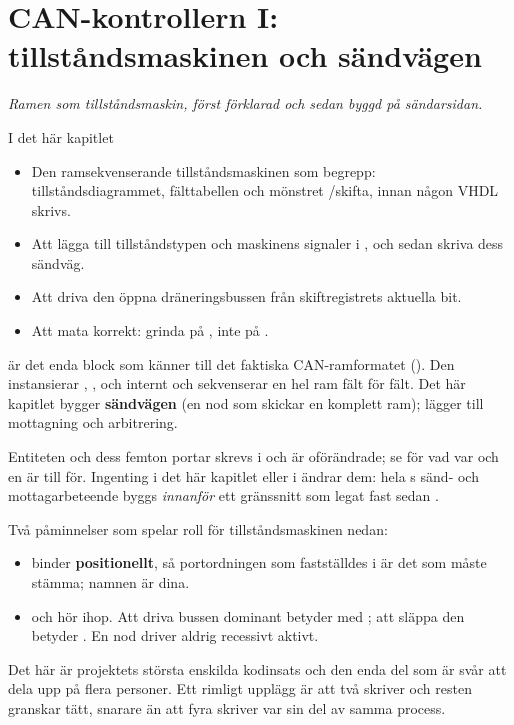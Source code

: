 
\chapter{CAN-kontrollern I: tillståndsmaskinen och sändvägen}
\label{c16:ch}

{\large\itshape Ramen som tillståndsmaskin, först förklarad och sedan byggd på sändarsidan.\par}

\begin{chapterbox}{I det här kapitlet}
\begin{itemize}
  \item Den ramsekvenserande tillståndsmaskinen som begrepp: tillståndsdiagrammet, fälttabellen och
    mönstret /skifta, innan någon VHDL skrivs.
  \item Att lägga till tillståndstypen och maskinens signaler i , och sedan
    skriva dess sändväg.
  \item Att driva den öppna dräneringsbussen från skiftregistrets aktuella bit.
  \item Att mata  korrekt: grinda på , inte på .
\end{itemize}
\end{chapterbox}

 är det enda block som känner till det faktiska CAN-ramformatet
(). Den instansierar , ,  och
 internt och sekvenserar en hel ram fält för fält. Det här kapitlet bygger
\textbf{sändvägen} (en nod som skickar en komplett ram);  lägger till mottagning och
arbitrering.

Entiteten och dess femton portar skrevs i  och är oförändrade; se
 för vad var och en är till för. Ingenting i det här kapitlet eller i
 ändrar dem: hela s sänd- och mottagarbeteende byggs
\emph{innanför} ett gränssnitt som legat fast sedan .

Två påminnelser som spelar roll för tillståndsmaskinen nedan:
\begin{itemize}
  \item {} binder \textbf{positionellt}, så portordningen som fastställdes i
     är det som måste stämma; namnen är dina.
  \item {} och  hör ihop. Att driva bussen dominant betyder
     med ; att släppa den betyder . En nod
    driver aldrig recessivt aktivt.
\end{itemize}

Det här är projektets största enskilda kodinsats och den enda del som är svår att dela upp på flera
personer. Ett rimligt upplägg är att två skriver och resten granskar tätt, snarare än att fyra
skriver var sin del av samma process.




